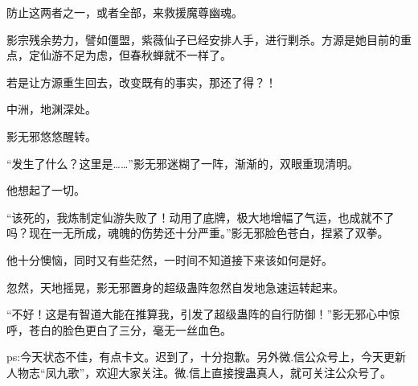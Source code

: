\begin{this_body}
防止这两者之一，或者全部，来救援魔尊幽魂。

影宗残余势力，譬如僵盟，紫薇仙子已经安排人手，进行剿杀。方源是她目前的重点，定仙游不足为虑，但春秋蝉就不一样了。

若是让方源重生回去，改变既有的事实，那还了得？！

中洲，地渊深处。

影无邪悠悠醒转。

“发生了什么？这里是……”影无邪迷糊了一阵，渐渐的，双眼重现清明。

他想起了一切。

“该死的，我炼制定仙游失败了！动用了底牌，极大地增幅了气运，也成就不了吗？现在一无所成，魂魄的伤势还十分严重。”影无邪脸色苍白，捏紧了双拳。

他十分懊恼，同时又有些茫然，一时间不知道接下来该如何是好。

忽然，天地摇晃，影无邪置身的超级蛊阵忽然自发地急速运转起来。

“不好！这是有智道大能在推算我，引发了超级蛊阵的自行防御！”影无邪心中惊呼，苍白的脸色更白了三分，毫无一丝血色。

ps:今天状态不佳，有点卡文。迟到了，十分抱歉。另外微.信公众号上，今天更新人物志“凤九歌”，欢迎大家关注。微.信上直接搜蛊真人，就可关注公众号了。

\end{this_body}

